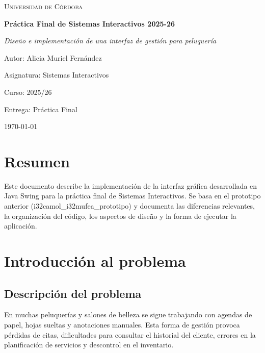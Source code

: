 \documentclass[12pt,a4paper]{report}
\begin{document}
\begin{titlepage}
    \centering
    {\scshape\LARGE Universidad de Córdoba\par}
    \vspace{1cm}
    {\huge\bfseries Práctica Final de Sistemas Interactivos 2025-26\par}
    \vspace{1.5cm}
    {\Large \textit{Diseño e implementación de una interfaz de gestión para peluquería}}\par
    \vspace{2cm}
    {\Large Autor: Alicia Muriel Fernández}\par
    \vspace{0.5cm}
    {\Large Asignatura: Sistemas Interactivos}\par
    \vspace{0.5cm}
    {\Large Curso: 2025/26}\par
    \vspace{0.5cm}
    {\Large Entrega: Práctica Final}\par
    \vfill
    \vspace{1cm}
    {\large \today}\par
\end{titlepage}

\tableofcontents
\clearpage

\chapter*{Resumen}
Este documento describe la implementación de la interfaz gráfica desarrollada en Java Swing para la práctica final de Sistemas Interactivos. Se basa en el prototipo anterior (i32camol_i32mufea_prototipo) y documenta las diferencias relevantes, la organización del código, los aspectos de diseño y la forma de ejecutar la aplicación.
\clearpage

\chapter{Introducción al problema}
\section{Descripción del problema}
En muchas peluquerías y salones de belleza se sigue trabajando con agendas de papel, hojas sueltas y anotaciones manuales. Esta forma de gestión provoca pérdidas de citas, dificultades para consultar el historial del cliente, errores en la planificación de servicios y descontrol en el inventario.
\end{document}
